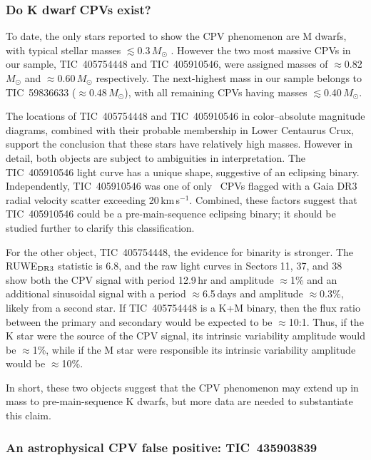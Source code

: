 \documentclass[11pt,twocolumn,tighten,linenumbers]{aastex63}
\newcommand{\kms}{{km\,s$^{-1}$}}
\begin{document}
\subsubsection{Do K dwarf CPVs exist?}
\label{subsec:massive}

To date, the only stars reported to show the CPV phenomenon are M
dwarfs, with typical stellar masses $\lesssim$0.3\,$M_\odot$
\citep{2017AJ....153..152S,2022AJ....163..144G}.  However the two most
massive CPVs in our sample, TIC~405754448 and TIC~405910546, were
assigned masses of $\approx$0.82\,$M_\odot$ and
$\approx$0.60\,$M_\odot$ respectively.  The next-highest mass in our
sample belongs to TIC~59836633 ($\approx$0.48\,$M_\odot$), with all
remaining CPVs having masses $\lesssim$0.40\,$M_\odot$.

The locations of TIC~405754448 and TIC~405910546 in color--absolute
magnitude diagrams, combined with their probable membership in Lower
Centaurus Crux, support the conclusion that these stars have
relatively high masses.  However in detail, both objects are subject
to ambiguities in interpretation.  The TIC~405910546 light curve has a
unique shape, suggestive of an eclipsing binary.  Independently,
TIC~405910546 was one of only \nrvscatterflag\ CPVs flagged with a
Gaia DR3 radial velocity scatter exceeding 20\,\kms.  Combined, these
factors suggest that TIC~405910546 could be a pre-main-sequence
eclipsing binary; it should be studied further to clarify this
classification.

For the other object, TIC~405754448, the evidence for binarity is
stronger.  The RUWE$_{\rm DR3}$ statistic is 6.8, and the raw light
curves in Sectors 11, 37, and 38 show both the CPV signal with period
12.9\,hr and amplitude $\approx$1\% and an additional sinusoidal
signal with a period $\approx$6.5\,days and amplitude $\approx$0.3\%,
likely from a second star.  If TIC~405754448 is a K+M binary, then the
flux ratio between the primary and secondary would be expected to be
$\approx$10:1.  Thus, if the K star were the source of the CPV signal,
its intrinsic variability amplitude would be $\approx$1\%, while if
the M star were responsible its intrinsic variability amplitude would
be $\approx$10\%.

In short, these two objects suggest that the CPV phenomenon may extend
up in mass to pre-main-sequence K dwarfs, but more data are needed to
substantiate this claim.


\subsubsection{An astrophysical CPV false positive: TIC~435903839}
\end{document}

